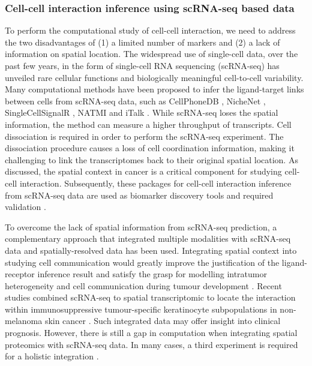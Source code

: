 \subsubsection{Cell-cell interaction inference using scRNA-seq based data}
To perform the computational study of cell-cell interaction, we need to address the two disadvantages of (1) a limited number of markers and (2) a lack of information on spatial location. The widespread use of single-cell data, over the past few years, in the form of single-cell RNA sequencing (scRNA-seq) has unveiled rare cellular functions and biologically meaningful cell-to-cell variability. Many computational methods have been proposed to infer the ligand-target links between cells from scRNA-seq data, such as CellPhoneDB \cite{efremova2020cellphonedb}, NicheNet \cite{browaeys2020nichenet}, SingleCellSignalR \cite{cabello2020singlecellsignalr}, NATMI \cite{hou2020predicting} and iTalk \cite{wang2019italk}. While scRNA-seq loses the spatial information, the method can measure a higher throughput of transcripts. Cell dissociation is required in order to perform the scRNA-seq experiment. The dissociation procedure causes a loss of cell coordination information, making it challenging to link the transcriptomes back to their original spatial location. As discussed, the spatial context in cancer is a critical component for studying cell-cell interaction. Subsequently, these packages for cell-cell interaction inference from scRNA-seq data are used as biomarker discovery tools and required validation \cite{de2020unraveling}. 

To overcome the lack of spatial information from scRNA-seq prediction, a complementary approach that integrated multiple modalities with scRNA-seq data and spatially-resolved data has been used. Integrating spatial context into studying cell communication would greatly improve the justification of the ligand-receptor inference result and satisfy the grasp for modelling intratumor heterogeneity and cell communication during tumour development \cite{crosetto2015spatially, pages2010immune, marusyk2012intra,bedard2013tumour}. Recent studies combined scRNA-seq to spatial transcriptomic to locate the interaction within immunosuppressive tumour-specific keratinocyte subpopulations in non-melanoma skin cancer \cite{ji2020multimodal}. Such integrated data may offer insight into clinical prognosis. However, there is still a gap in computation when integrating spatial proteomics with scRNA-seq data. In many cases, a third experiment is required for a holistic integration \cite{ji2020multimodal, schulz2018simultaneous, govek2021single}.    

